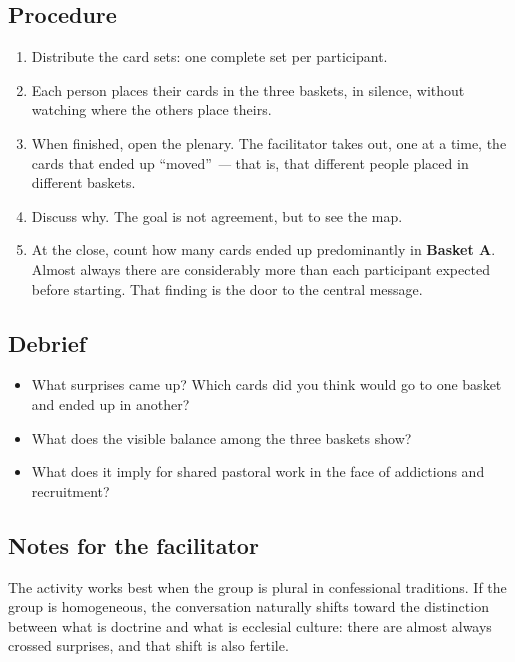 \documentclass[11pt, a4paper]{article}
\begin{document}
\begin{actividad}
\subsection*{Procedure}
\begin{enumerate}[label={\arabic*.}]
  \item Distribute the card sets: one complete set per participant.
  \item Each person places their cards in the three baskets, in silence, without watching where the others place theirs.
  \item When finished, open the plenary. The facilitator takes out, one at a time, the cards that ended up ``moved'' \emph{---} that is, that different people placed in different baskets.
  \item Discuss why. The goal is not agreement, but to see the map.
  \item At the close, count how many cards ended up predominantly in \textbf{Basket A}. Almost always there are considerably more than each participant expected before starting. That finding is the door to the central message.
\end{enumerate}

\subsection*{Debrief}
\begin{itemize}
  \item What surprises came up? Which cards did you think would go to one basket and ended up in another?
  \item What does the visible balance among the three baskets show?
  \item What does it imply for shared pastoral work in the face of addictions and recruitment?
\end{itemize}

\subsection*{Notes for the facilitator}
The activity works best when the group is plural in confessional traditions. If the group is homogeneous, the conversation naturally shifts toward the distinction between what is doctrine and what is ecclesial culture: there are almost always crossed surprises, and that shift is also fertile.

\end{actividad}

\newpage
\end{document}
